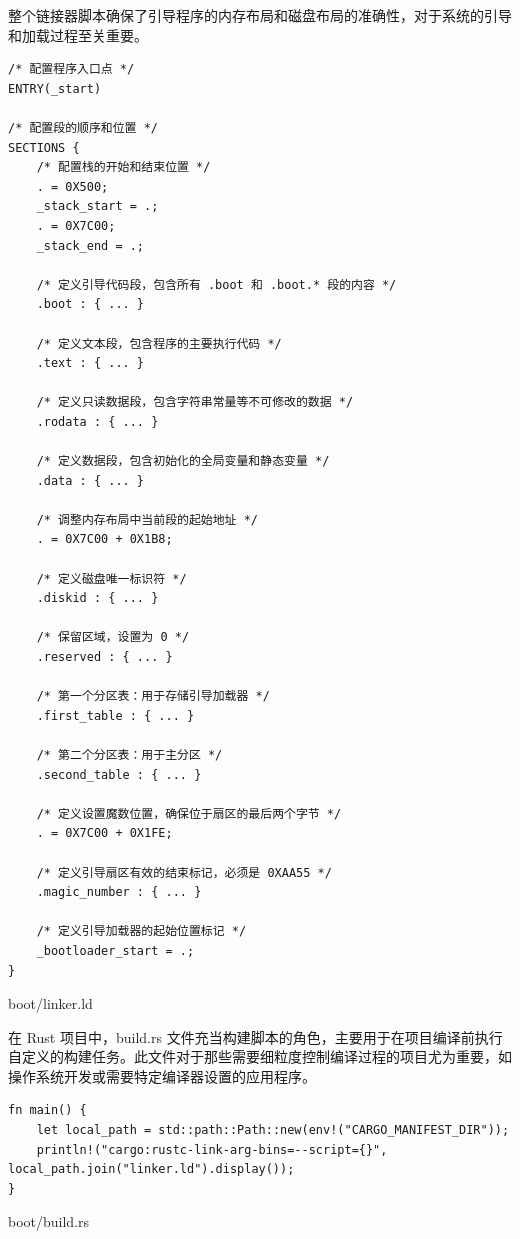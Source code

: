 整个链接器脚本确保了引导程序的内存布局和磁盘布局的准确性，对于系统的引导和加载过程至关重要。

\begin{listing}[htbp]
    \begin{verbatim}
/* 配置程序入口点 */
ENTRY(_start)

/* 配置段的顺序和位置 */
SECTIONS {
    /* 配置栈的开始和结束位置 */
    . = 0X500;
    _stack_start = .;
    . = 0X7C00;
    _stack_end = .;

    /* 定义引导代码段，包含所有 .boot 和 .boot.* 段的内容 */
    .boot : { ... }

    /* 定义文本段，包含程序的主要执行代码 */
    .text : { ... }

    /* 定义只读数据段，包含字符串常量等不可修改的数据 */
    .rodata : { ... }

    /* 定义数据段，包含初始化的全局变量和静态变量 */
    .data : { ... }

    /* 调整内存布局中当前段的起始地址 */
    . = 0X7C00 + 0X1B8;

    /* 定义磁盘唯一标识符 */
    .diskid : { ... }

    /* 保留区域，设置为 0 */
    .reserved : { ... }

    /* 第一个分区表：用于存储引导加载器 */
    .first_table : { ... }

    /* 第二个分区表：用于主分区 */
    .second_table : { ... }

    /* 定义设置魔数位置，确保位于扇区的最后两个字节 */
    . = 0X7C00 + 0X1FE;

    /* 定义引导扇区有效的结束标记，必须是 0XAA55 */
    .magic_number : { ... }

    /* 定义引导加载器的起始位置标记 */
    _bootloader_start = .;
}
    \end{verbatim}
    \caption{boot/linker.ld}\label{lst:BootLinkerScript}
\end{listing}

在 Rust 项目中，build.rs 文件充当构建脚本的角色，主要用于在项目编译前执行自定义的构建任务。此文件对于那些需要细粒度控制编译过程的项目尤为重要，如操作系统开发或需要特定编译器设置的应用程序。

\begin{listing}[htbp]
    \begin{verbatim}
fn main() {
    let local_path = std::path::Path::new(env!("CARGO_MANIFEST_DIR"));
    println!("cargo:rustc-link-arg-bins=--script={}", local_path.join("linker.ld").display());
}
    \end{verbatim}
    \caption{boot/build.rs}\label{lst:BootBuildRust}
\end{listing}

